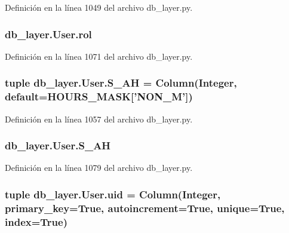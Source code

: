 Definición en la línea 1049 del archivo db\-\_\-layer.\-py.

\hypertarget{classdb__layer_1_1_user_a9653e795718277a60fad44950b9c7f35}{
\subsubsection[{rol}]{\setlength{\rightskip}{0pt plus 5cm}db\-\_\-layer.\-User.\-rol}}\label{classdb__layer_1_1_user_a9653e795718277a60fad44950b9c7f35}


Definición en la línea 1071 del archivo db\-\_\-layer.\-py.

\hypertarget{classdb__layer_1_1_user_a612925ca4a2496400fcdd7b6634ff812}{
\subsubsection[{S\-\_\-\-A\-H}]{\setlength{\rightskip}{0pt plus 5cm}tuple db\-\_\-layer.\-User.\-S\-\_\-\-A\-H = Column(Integer, default={\bf H\-O\-U\-R\-S\-\_\-\-M\-A\-S\-K}\mbox{[}'N\-O\-N\-\_\-\-M'\mbox{]})\hspace{0.3cm}{\ttfamily [static]}}}\label{classdb__layer_1_1_user_a612925ca4a2496400fcdd7b6634ff812}


Definición en la línea 1057 del archivo db\-\_\-layer.\-py.

\hypertarget{classdb__layer_1_1_user_a0360cfcd177fc4336b8ea141e5ca956a}{
\subsubsection[{S\-\_\-\-A\-H}]{\setlength{\rightskip}{0pt plus 5cm}db\-\_\-layer.\-User.\-S\-\_\-\-A\-H}}\label{classdb__layer_1_1_user_a0360cfcd177fc4336b8ea141e5ca956a}


Definición en la línea 1079 del archivo db\-\_\-layer.\-py.

\hypertarget{classdb__layer_1_1_user_aaf892db2c6e38a461364db0e751b9f63}{
\subsubsection[{uid}]{\setlength{\rightskip}{0pt plus 5cm}tuple db\-\_\-layer.\-User.\-uid = Column(Integer, primary\-\_\-key=True, autoincrement=True, unique=True, index=True)\hspace{0.3cm}{\ttfamily [static]}}}\label{classdb__layer_1_1_user_aaf892db2c6e38a461364db0e751b9f63}



